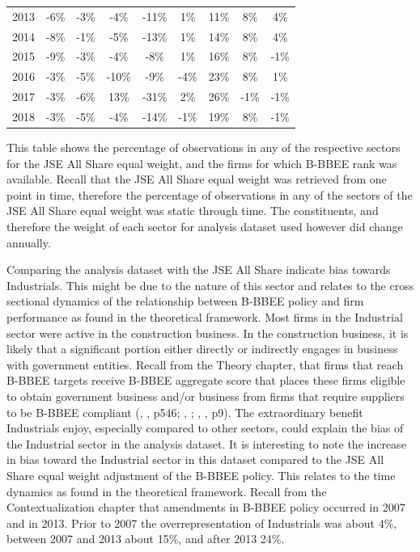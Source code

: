 \begin{table}[H]
{\begin{tabular}{ccccccccc}
2013 & -6\%            & -3\%           & -4\%              & -11\%      & 1\%        & 11\%        & 8\%        & 4\%                \\
2014 & -8\%            & -1\%           & -5\%              & -13\%      & 1\%        & 14\%        & 8\%        & 4\%                \\
2015 & -9\%            & -3\%           & -4\%              & -8\%       & 1\%        & 16\%        & 8\%        & -1\%               \\
2016 & -3\%            & -5\%           & -10\%             & -9\%       & -4\%       & 23\%        & 8\%        & 1\%                \\
2017 & -3\%            & -6\%           & 13\%              & -31\%      & 2\%        & 26\%        & -1\%       & -1\%               \\
2018 & -3\%            & -5\%           & -4\%              & -14\%      & -1\%       & 19\%        & 8\%        & -1\%  \\ 
   \bottomrule
\end{tabular}}
\end{table} 
This table shows the percentage of observations in any of the respective sectors for the JSE All Share equal weight, and the firms for which B-BBEE rank was available. Recall that the JSE All Share equal weight was retrieved from one point in time, therefore the percentage of observations in any of the sectors of the JSE All Share equal weight was static through time. The constituents, and therefore the weight of each sector for analysis dataset used however did change annually.

Comparing the analysis dataset with the JSE All Share indicate bias towards Industrials. This might be due to the nature of this sector and relates to the cross sectional dynamics of the relationship between B-BBEE policy and firm performance as found in the theoretical framework. Most firms in the Industrial sector were active in the construction business. In the construction business, it is likely that a significant portion either directly or indirectly engages in business with government entities. Recall from the Theory chapter, that firms that reach B-BBEE targets receive B-BBEE aggregate score that places these firms eligible to obtain government business and/or business from firms that require suppliers to be B-BBEE compliant  (\citeauthor{N7}, \citeyear{N7}, p546; \citeauthor{N3}, \citeyear{N3}; \citeauthor{N5}, \citeyear{N5}, p9). The extraordinary benefit Industrials enjoy, especially compared to other sectors, could explain the bias of the Industrial sector in the analysis dataset. It is interesting to note the increase in bias toward the Industrial sector in this dataset compared to the JSE All Share equal weight adjustment of the B-BBEE policy. This relates to the time dynamics as found in the theoretical framework. Recall from the Contextualization chapter that amendments in B-BBEE policy occurred in 2007 and in 2013. Prior to 2007 the overrepresentation of Industrials was about 4\%, between 2007 and 2013 about 15\%, and after 2013 24\%.


